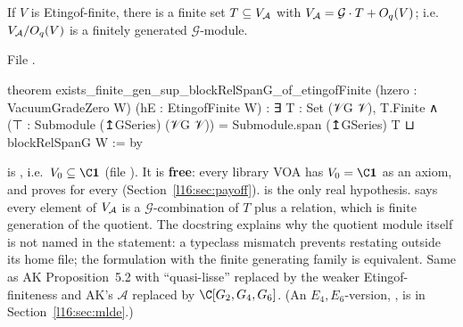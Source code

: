 \begin{theorem}\label{l16:thm:prop52}
If $V$ is Etingof-finite, there is a finite set $T\subseteq V_{\mathcal A}$ with
$V_{\mathcal A} = \mathcal G\cdot T + O_q(V)$; i.e.\ $V_{\mathcal A}/O_q(V)$ is a finitely generated
$\mathcal G$-module.
\end{theorem}
\noindent File .
\begin{leancode}
theorem exists_finite_gen_sup_blockRelSpanG_of_etingofFinite (hzero : VacuumGradeZero W)
    (hE : EtingofFinite W) :
    ∃ T : Set (𝒱G 𝒱), T.Finite ∧
      (⊤ : Submodule (↥GSeries) (𝒱G 𝒱))
        = Submodule.span (↥GSeries) T ⊔ blockRelSpanG W := by
\end{leancode}

\begin{dictionary}
 is , i.e.\ $V_0\subseteq\C\lsixteenvac$
(file ). It is \textbf{free}: every library VOA has
$V_0=\C\lsixteenvac$ as an axiom, and \allowbreak{}\allowbreak{}\allowbreak{} proves
 for every  (Section~\ref{l16:sec:payoff}).  is the only real hypothesis.
 says every element of $V_{\mathcal A}$ is a $\mathcal G$-combination of $T$ plus a
relation, which is finite generation of the quotient. The docstring explains why the quotient module itself is not
named in the statement: a typeclass mismatch prevents restating \allowbreak{}
outside its home file; the formulation with the finite generating family is equivalent. Same as AK Proposition~5.2
with ``quasi-lisse'' replaced by the weaker Etingof-finiteness and AK's $\mathcal A$ replaced by
$\C[G_2,G_4,G_6]$. (An $E_4,E_6$-version, \allowbreak{}\allowbreak{}\allowbreak{}\allowbreak{}, is in
Section~\ref{l16:sec:mlde}.)
\end{dictionary}

